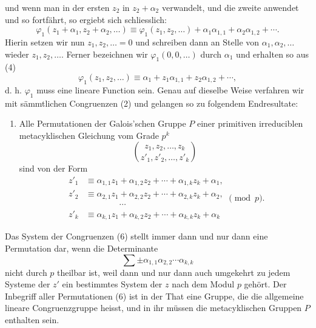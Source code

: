 \documentclass[11pt]{article}
\begin{document}
und wenn man in der ersten $z_2$ in $z_2+\alpha_2$ verwandelt, und die zweite anwendet und so fortfährt, so ergiebt sich schliesslich:
\begin{equation}
 \varphi_1(z_1+\alpha_1,z_2+\alpha_2,\ldots)
 \equiv
 \varphi_1(z_1,z_2,\ldots)+\alpha_1\alpha_{1,1}
      +\alpha_2\alpha_{1,2}+\cdots .
 \tag{4}
\end{equation}
Hierin setzen wir nun $z_1,z_2,\ldots=0$ und schreiben dann an Stelle von $\alpha_1,\alpha_2,\ldots$ wieder $z_1,z_2,\ldots$. Ferner bezeichnen wir $\varphi_1(0,0,\ldots)$ durch $\alpha_1$ und erhalten so aus (4)
\begin{equation}
 \varphi_1(z_1,z_2,\ldots)
 \equiv
 \alpha_1+z_1\alpha_{1,1}+z_2\alpha_{1,2}+\cdots,
 \tag{5}
\end{equation}
d. h. $\varphi_1$ muss eine lineare Function sein. Genau auf dieselbe Weise verfahren wir mit sämmtlichen Congruenzen (2) und gelangen so zu folgendem Endresultate:

\begin{enumerate}[label=\Roman*.,leftmargin=2.8em]
\item Alle Permutationen der Galois'schen Gruppe $P$ einer primitiven irreduciblen metacyklischen Gleichung vom Grade $p^k$
\[
 \binom{z_1,z_2,\ldots,z_k}{z'_1,z'_2,\ldots,z'_k}
\]
sind von der Form
\begin{equation}
\begin{aligned}
 z'_1&\equiv \alpha_{1,1}z_1+\alpha_{1,2}z_2+\cdots+\alpha_{1,k}z_k+\alpha_1,\\
 z'_2&\equiv \alpha_{2,1}z_1+\alpha_{2,2}z_2+\cdots+\alpha_{2,k}z_k+\alpha_2,\\
 &\hspace{4em}\cdots\\
 z'_k&\equiv \alpha_{k,1}z_1+\alpha_{k,2}z_2+\cdots+\alpha_{k,k}z_k+\alpha_k
\end{aligned}
\pmod p .
 \tag{6}
\end{equation}
\end{enumerate}

Das System der Congruenzen (6) stellt immer dann und nur dann eine Permutation dar, wenn die Determinante
\[
 \sum \pm\alpha_{1,1}\alpha_{2,2}\cdots\alpha_{k,k}
\]
nicht durch $p$ theilbar ist, weil dann und nur dann auch umgekehrt zu jedem Systeme der $z'$ ein bestimmtes System der $z$ nach dem Modul $p$ gehört. Der Inbegriff aller Permutationen (6) ist in der That eine Gruppe, die die allgemeine lineare Congruenzgruppe heisst, und in ihr müssen die metacyklischen Gruppen $P$ enthalten sein.
\end{document}
